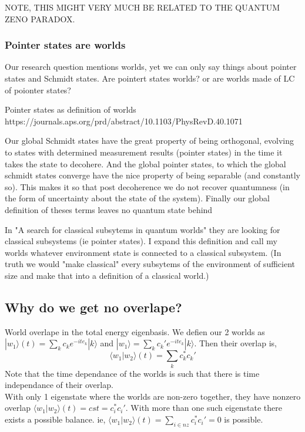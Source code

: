 \documentclass{article}
\begin{document}
NOTE, THIS MIGHT VERY MUCH BE RELATED TO THE QUANTUM ZENO PARADOX.

\subsubsection{Pointer states are worlds}

Our research question mentions worlds, yet we can only say things about pointer states and Schmidt states. Are pointert states worlds? or are worlds made of LC of poionter states? 

Pointer states as definition of worlds
https://journals.aps.org/prd/abstract/10.1103/PhysRevD.40.1071

Our global Schmidt states have the great property of being orthogonal, evolving to states with determined measurement results (pointer states) in the time it takes the state to decohere. And the global pointer states, to which the global schmidt states converge have the nice property of being separable (and constantly so).  This makes it so that post decoherence we do not recover quantumness (in the form of uncertainty about the state of the system). Finally our global definition of theses terms leaves no quantum state behind

In "A search for classical subsytems in quantum worlds" they are looking for classical subsystems (ie pointer states). I expand this definition and call my worlds whatever environment state is connected to a classical subsystem. (In truth we would "make classical" every subsytems of the environment of sufficient size and make that into a definition of a classical world.)


\subsection{Why do we get no overlape?}
World overlape in the total energy eigenbasis. We defien our 2 worlds as $|w_1\rangle(t)=\sum_kc_ke^{-ite_k}|k\rangle$ and $|w_1\rangle=\sum_kc_k'e^{-ite_k}|k\rangle$. 
Then their overlap is,
\begin{equation}
    \langle w_1|w_2 \rangle(t) = \sum_{k}c_k^*c_k'
\end{equation}
Note that the time dependance of the worlds is such that there is time independance of their overlap.\\

With only 1 eigenstate where the worlds are non-zero together, they have nonzero overlap $\langle w_1|w_2 \rangle(t)=cst=c_i^*c_i'$. With more than one such eigenstate there exists a possible balance. ie, $\langle w_1|w_2 \rangle(t)=\sum_{i\in nz}c_i^*c_i'=0$ is possible. 
\end{document}
